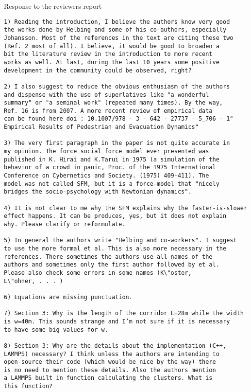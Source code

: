 \documentclass[a4paper,12pt]{letter}
\begin{document}
\begin{letter}{Response to the reviewers report}
\begin{verbatim}
1) Reading the introduction, I believe the authors know very good 
the works done by Helbing and some of his co-authors, especially 
Johansson. Most of the references in the text are citing these two 
(Ref. 2 most of all). I believe, it would be good to broaden a 
bit the literature review in the introduction to more recent 
works as well. At last, during the last 10 years some positive 
development in the community could be observed, right?

2) I also suggest to reduce the obvious enthusiasm of the authors 
and dispense with the use of superlatives like "a wonderful 
summary" or "a seminal work" (repeated many times). By the way, 
Ref. 16 is from 2007. A more recent review of empirical data 
can be found here doi : 10.1007/978 - 3 - 642 - 27737 - 5_706 - 1"
Empirical Results of Pedestrian and Evacuation Dynamics"

3) The very first paragraph in the paper is not quite accurate in 
my opinion. The force social force model ever presented was 
published in K. Hirai and K.Tarui in 1975 (a simulation of the 
behavior of a crowd in panic, Proc. of the 1975 International 
Conference on Cybernetics and Society. (1975) 409-411). The 
model was not called SFM, but it is a force-model that "nicely 
bridges the socio-psychology with Newtonian dynamics".

4) It is not clear to me why the SFM explains why the faster-is-slower 
effect happens. It can be produces, yes, but it does not explain 
why. Please clarify or reformulate.

5) In general the authors write "Helbing and co-workers". I suggest 
to use the more formal et al. This is also more necessary in the 
references. There sometimes the authors use all names of the 
authors and sometimes only the first author followed by et al. 
Please also check some errors in some names (K\"oster, 
L\"ohner, . . . )

6) Equations are missing punctuation.

7) Section 3: Why is the length of the corridor L=28m while the width 
is w=40m. This sounds strange and I’m not sure if it is necessary 
to have some big values for w.

8) Section 3: Why are the details about the implementation (C++, 
LAMMPS) necessary? I think unless the authors are intending to 
open-source their code (which would be nice by the way) there 
is no need to mention these details. Also the authors mention 
a LAMMPS built in function calculating the clusters. What is
this function?


\end{verbatim}
\end{letter}
\end{document}
